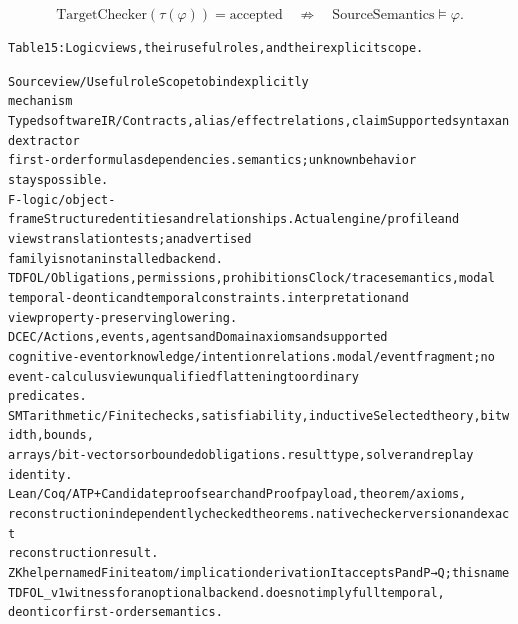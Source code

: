 \documentclass{article}
\begin{document}
\setcounter{equation}{2}
\begin{equation}
\mathrm{TargetChecker}(\tau(\varphi))=\mathrm{accepted}\quad\not\Rightarrow\quad\mathrm{SourceSemantics}\models\varphi.
\tag{3}\end{equation}

\begingroup\fontsize{7}{8.4}\selectfont
\begin{alltt}
Table 15: Logic views, their useful roles, and their explicit scope.
\end{alltt}\endgroup

\begingroup\fontsize{7}{8.4}\selectfont
\begin{alltt}
Source view /              Useful role                                Scope to bind explicitly
mechanism
Typed software IR /        Contracts, alias/effect relations, claim   Supported syntax and extractor
first-order formulas       dependencies.                              semantics; unknown behavior
                                                                      stays possible.
F-logic / object-frame     Structured entities and relationships.     Actual engine/profile and
views                                                                 translation tests; an advertised
                                                                      family is not an installed backend.
TDFOL /                    Obligations, permissions, prohibitions     Clock/trace semantics, modal
temporal-deontic           and temporal constraints.                  interpretation and
view                                                                  property-preserving lowering.
DCEC /                     Actions, events, agents and                Domain axioms and supported
cognitive-event or         knowledge/intention relations.             modal/event fragment; no
event-calculus view                                                   unqualified flattening to ordinary
                                                                      predicates.
SMT arithmetic /           Finite checks, satisfiability, inductive   Selected theory, bit width, bounds,
arrays / bit-vectors       or bounded obligations.                    result type, solver and replay
                                                                      identity.
Lean / Coq / ATP +         Candidate proof search and                 Proof payload, theorem/axioms,
reconstruction             independently checked theorems.            native checker version and exact
                                                                      reconstruction result.
ZK helper named            Finite atom/implication derivation         It accepts P and P→Q; this name
TDFOL\_v1                   witness for an optional backend.           does not imply full temporal,
                                                                      deontic or first-order semantics.
\end{alltt}\endgroup
\end{document}
